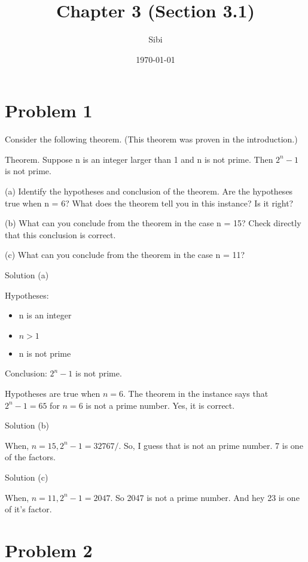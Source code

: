\documentclass{article}
\begin{document}
\title{Chapter 3 (Section 3.1)}
\author{Sibi}
\date{\today}
\maketitle
\newpage

\section{Problem 1}
Consider the following theorem. (This theorem was proven in the
introduction.)

Theorem. Suppose n is an integer larger than 1 and n is not prime.
Then $2^n - 1$  is not prime.

(a) Identify the hypotheses and conclusion of the theorem. Are the
hypotheses true when n = 6? What does the theorem tell you in this
instance? Is it right?

(b) What can you conclude from the theorem in the case n = 15? Check
directly that this conclusion is correct.

(c) What can you conclude from the theorem in the case n = 11?

Solution (a)

Hypotheses:
\begin{itemize}
\item n is an integer
\item $n > 1$
\item n is not prime
\end{itemize}

Conclusion:
$2^n - 1$ is not prime.

Hypotheses are true when $n = 6$. The theorem in the instance says
that $2^n - 1 = 65$ for $n=6$ is not a prime number. Yes, it is
correct.

Solution (b)

When, $n=15, 2^n - 1 = 32767/$. So, I guess that is not an prime
number. 7 is one of the factors.

Solution (c)

When, $n=11, 2^n - 1 = 2047$. So 2047 is not a prime number. And hey
23 is one of it's factor.

\section{Problem 2}
\end{document}
